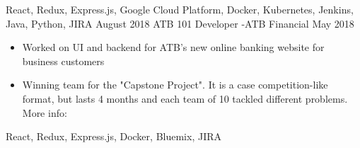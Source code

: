 \begin{experiences}
{                    }
                    {
                        React,
                        Redux,
                        Express.js,
                        Google Cloud Platform,
                        Docker,
                        Kubernetes,
                        Jenkins,
                        Java,
                        Python,
                        JIRA
                    }
  \emptySeparator
  \experience
  {August 2018}   {ATB 101 Developer -}{ATB Financial}{}
  {May 2018} {
                    \begin{itemize}
                      \item Worked on UI and backend for ATB's new online banking website for business customers
                      \item Winning team for the "Capstone Project". It is a case competition-like format,
                      but lasts 4 months and each team of 10 tackled different problems.
                      More info: 
                    \end{itemize}
                  }
                  {
                      React,
                      Redux,
                      Express.js,
                      Docker,
                      Bluemix,
                      JIRA
                  }
\end{experiences}
